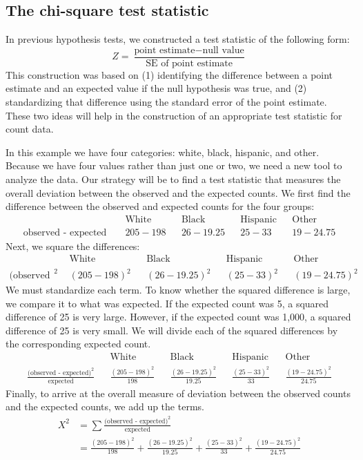 \subsection{The chi-square test statistic}
\label{chiSquareTestStatistic}

In previous hypothesis tests, we constructed a test statistic of the following form:
$$ Z = \frac{\text{point estimate} - \text{null value}}{\text{SE of point estimate}} $$
This construction was based on (1) identifying the difference between a point estimate and an expected value if the null hypothesis was true, and (2) standardizing that difference using the standard error of the point estimate. These two ideas will help in the construction of an appropriate test statistic for count data.

In this example we have four categories: white, black, hispanic, and other. Because we have four values rather than just one or two, we need a new tool to analyze the data. Our strategy will be to find a test statistic that measures the overall deviation between the observed and the expected counts. We first find the difference between the observed and expected counts for the four groups:
\begin{align*}
&&\text{White} && \text{Black} && \text{Hispanic} && \text{Other} \\
\text{observed - expected }&& 205-198 && 26-19.25
	&& 25-33
	&& 19-24.75
\end{align*}
Next, we square the differences:
\begin{align*}
&&\text{White} && \text{Black} && \text{Hispanic} && \text{Other} \\
\text{(observed - expected)}^2 && (205-198)^2 && (26-19.25)^2
	&& (25-33)^2
	&& (19-24.75)^2
\end{align*}
We must standardize each term. To know whether the squared difference is large, we compare it to what was expected. If the expected count was 5, a squared difference of 25 is very large. However, if the expected count was 1,000, a squared difference of 25 is very small. We will divide each of the squared differences by the corresponding expected count.
\begin{align*}
&&\text{White} && \text{Black} && \text{Hispanic} && \text{Other} \\
\frac{\text{(observed - expected)}^2}{\text{expected}} && \frac{(205-198)^2}{198} && \frac{(26-19.25)^2 }{19.25}
	&& \frac{(25-33)^2}{33}
	&& \frac{(19-24.75)^2}{24.75}
\end{align*}
Finally, to arrive at the overall measure of deviation between the observed counts and the expected counts, we add up the terms.
\begin{align*}
X^2 &= \sum{\frac{\text{(observed - expected)}^2}{\text{expected}}} \\
	&= \frac{(205-198)^2}{198}
		+ \frac{(26-19.25)^2 }{19.25}
		+ \frac{(25-33)^2}{33}
		+ \frac{(19-24.75)^2}{24.75}
\end{align*}

